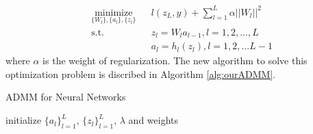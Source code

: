 \documentclass[letterpaper, 10 pt, conference]{ieeeconf}  %
\begin{document}
\begin{equation}
\begin{aligned} 
& \underset{\{W_l\},\{a_l\}, \{z_l\}}{\text{minimize}}
& & l(z_L,y) + \sum_{l=1}^L \alpha ||W_l||^2 \\
& \text{s.t.}
& & z_l = W_la_{l-1},  l = 1,2,...,L \\
& & & a_l = h_l(z_l),  l = 1,2,...L-1 \label{eq:modelWithReg}
\end{aligned}
\end{equation}
where $\alpha$ is the weight of regularization. The new algorithm to solve this optimization problem is discribed in Algorithm \ref{alg:ourADMM}.
\begin{algorithm} 
\caption{ADMM for Neural Networks}
\label{alg:ourADMM}
initialize $\{a_l\}^{L}_{l=1}$, $\{z_l\}^{L}_{l=1}$, $\lambda$ and weights\\

\end{algorithm}
\end{document}
